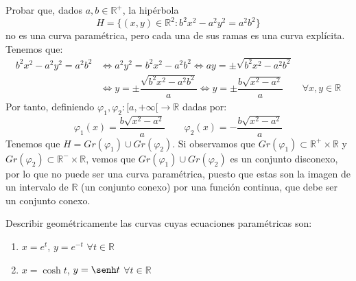 \begin{ejercicio}
Probar que, dados \( a,b \in \mathbb{R}^+ \), la hipérbola \[ H=\{(x,y) \in \mathbb{R}^2 : b^2x^2 - a^2y^2 = a^2b^2\} \] no es una curva paramétrica, pero cada una de sus ramas es una curva explícita.\\

\noindent
Tenemos que:
\begin{align*}
    b^2x^2 - a^2y^2 = a^2b^2 &\Longleftrightarrow a^2y^2 = b^2x^2-a^2b^2 \Longleftrightarrow ay = \pm \sqrt{b^2x^2-a^2b^2} \\
                             &\Longleftrightarrow y = \pm \dfrac{\sqrt{b^2x^2-a^2b^2}}{a}  \Longleftrightarrow y = \pm \dfrac{b\sqrt{x^2-a^2}}{a}\qquad \forall x,y\in \mathbb{R}
\end{align*}
Por tanto, definiendo $\varphi_1,\varphi_2:[a,+\infty[\to \mathbb{R}$ dadas por:
\begin{equation*}
    \varphi_1(x) = \dfrac{b\sqrt{x^2-a^2}}{a} \qquad \varphi_2(x) = -\dfrac{b\sqrt{x^2-a^2}}{a} 
\end{equation*}
Tenemos que $H = Gr(\varphi_1)\cup Gr(\varphi_2)$. \newline Si observamos que $Gr(\varphi_1)\subset \mathbb{R}^+\times \mathbb{R}$ y $Gr(\varphi_2)\subset\mathbb{R}^-\times\mathbb{R}$, vemos que $Gr(\varphi_1)\cup Gr(\varphi_2)$ es un conjunto disconexo, por lo que no puede ser una curva paramétrica, puesto que estas son la imagen de un intervalo de $\mathbb{R}$ (un conjunto conexo) por una función continua, que debe ser un conjunto conexo.
\end{ejercicio}

\begin{ejercicio}
Describir geométricamente las curvas cuyas ecuaciones paramétricas son:
\begin{enumerate}
    \item \( x = e^t \), \( y = e^{-t} \) \qquad \( \forall t \in \mathbb{R} \)
    \item \( x = \cosh t \), \( y = \senh t \) \qquad \( \forall t \in \mathbb{R} \)
\end{enumerate}
\end{ejercicio}
    
